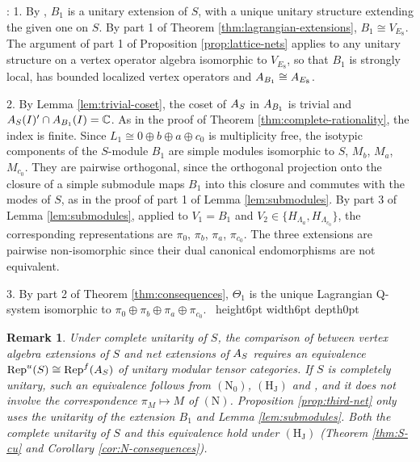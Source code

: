 \documentclass[leqno]{article}
\newcommand{\Cbb}{\ensuremath{\mathbb{C}}}
\newcommand{\Q}{\mathrm{Q}}
\let\cal\relax
\newcommand{\cal}{\mathcal}
\newcommand{\qed}{\hfill \vrule height6pt  width6pt depth0pt}
\DeclareMathOperator{\Rep}{Rep} %
\newtheorem{remark}[thm]{Remark}
\newenvironment{proof}[1][]{\noindent {\it Proof #1} : }{\hbox{~}\qed
\smallskip
}
\numberwithin{equation}{section}
\begin{document}
\begin{proof}
1. By \cite[Theorem 4.7 p.~19]{CGGH23}, $B_1$ is a unitary extension of $S$, with a unique unitary structure extending the given one on $S$. By part 1 of Theorem \ref{thm:lagrangian-extensions}, $B_1 \cong V_{E_8}$. The argument of part 1 of Proposition \ref{prop:lattice-nets} applies to any unitary structure on a vertex operator algebra isomorphic to $V_{E_8}$, so that $B_1$ is strongly local, has bounded localized vertex operators and $\cal A_{B_1} \cong \cal A_{E_8}$.

2. By Lemma \ref{lem:trivial-coset}, the coset of $\cal A_S$ in $\cal A_{B_1}$ is trivial and $\cal A_S(I)' \cap \cal A_{B_1}(I) = \Cbb$. As in the proof of Theorem \ref{thm:complete-rationality}, the index is finite. Since $L_1 \cong 0 \oplus b \oplus a \oplus c_0$ is multiplicity free, the isotypic components of the $S$-module $B_1$ are simple modules isomorphic to $S$, $M_b$, $M_a$, $M_{c_0}$. They are pairwise orthogonal, since the orthogonal projection onto the closure of a simple submodule maps $B_1$ into this closure and commutes with the modes of $S$, as in the proof of part 1 of Lemma \ref{lem:submodules}. By part 3 of Lemma \ref{lem:submodules}, applied to $V_1 = B_1$ and $V_2 \in \{H_{\Lambda_a},H_{\Lambda_{c_0}}\}$, the corresponding representations are $\pi_0$, $\pi_b$, $\pi_a$, $\pi_{c_0}$. The three extensions are pairwise non-isomorphic since their dual canonical endomorphisms are not equivalent.

3. By part 2 of Theorem \ref{thm:consequences}, $\Theta_1$ is the unique Lagrangian $\Q$-system isomorphic to $\pi_0 \oplus \pi_b \oplus \pi_a \oplus \pi_{c_0}$.
\end{proof}

\begin{remark}\normalfont
Under complete unitarity of $S$, the comparison of \cite[Theorem 4.10 p.~21]{CGGH23} between vertex algebra extensions of $S$ and net extensions of $\cal A_S$ requires an equivalence $\Rep^u(S) \cong \Rep^f(\cal A_S)$ of unitary modular tensor categories. If $S$ is completely unitary, such an equivalence follows from $\mathrm{(N_0)}$, $\mathrm{(H_J)}$ and \cite[Theorem 5 p.~2]{Reu23}, and it does not involve the correspondence $\pi_M \mapsto M$ of $\mathrm{(N)}$. Proposition \ref{prop:third-net} only uses the unitarity of the extension $B_1$ and Lemma \ref{lem:submodules}. Both the complete unitarity of $S$ and this equivalence hold under $\mathrm{(H_J)}$ (Theorem \ref{thm:S-cu} and Corollary \ref{cor:N-consequences}).
\end{remark}
\end{document}
